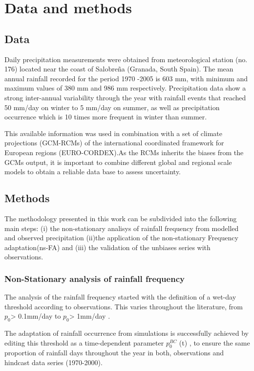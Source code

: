 \documentclass[a4paper,11pt]{article}
\begin{document}
\section{Data and methods}\label{sec2}
\subsection{Data} 
Daily precipitation measurements were obtained from meteorological station (no. 176) located near the coast of Salobreña (Granada, South Spain). The mean annual rainfall recorded for the period 1970 -2005 is 603 mm, with minimum and maximum values of 380 mm and 986 mm respectively. Precipitation data show a strong inter-annual variability through the year with rainfall events that reached 50 mm/day on winter to 5 mm/day on summer, as well as precipitation occurrence which is 10 times more frequent in winter than summer.

This available information was used in combination with a set of climate projections (GCM-RCMs) of the international coordinated framework for European regions (EURO-CORDEX).As the RCMs inherits the biases from the GCMs output, it is important to combine different global and regional scale models to obtain a reliable data base to assess uncertainty.  


\subsection{Methods} 
The methodology presented in this work can be subdivided into the following main steps: (i) the non-stationary analisys of rainfall frequency from modelled and observed precipitation (ii)the application of the non-stationary Frequency adaptation(ns-FA) and (iii) the validation of the unbiases series with observations.

\subsubsection{Non-Stationary analysis of rainfall frequency} 
The analysis of the rainfall frequency started with the definition of a wet-day threshold according to observations. This varies throughout the literature, from $p_{0}$> 0.1mm/day \cite{bib7} to $p_{0}$> 1mm/day \cite{bib8}. 

The adaptation of rainfall occurrence from simulations is successfully achieved by editing this threshold as a time-dependent parameter $p_{0}^{BC}$ (t)  , to ensure the same proportion of rainfall days throughout the year in both, observations and hindcast data series (1970-2000). 
\end{document}
